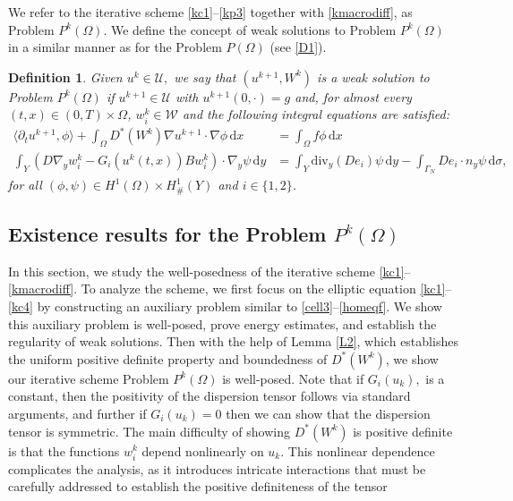 \documentclass[11pt]{article}
\newtheorem{definition}{Definition}[section]
\newcommand{\timeint}{(0,T)}
\newcommand{\di}[1]{\,\mathrm{d}#1}
\begin{document}
We refer to the iterative scheme \eqref{kc1}--\eqref{kp3} together with \eqref{kmacrodiff}, as Problem $P^k(\Omega)$. 
We define the concept of weak solutions to Problem $P^k(\Omega)$ in a similar manner as for the Problem $P(\Omega)$ (see \cref{D1}).
%
\begin{definition}\label{D2}
   Given $u^k\in\mathcal{U},$  we say that $(u^{k+1},W^k)$ is a weak solution to Problem $P^k(\Omega)$ if $u^{k+1} \in \mathcal{U}$ with $u^{k+1}(0,\cdot) = g$ and, for almost every $(t,x) \in \timeint\times \Omega$, $w_i^{k} \in \mathcal{W}$ and the following integral equations are satisfied:
\begin{subequations}
\begin{align}
       \langle \partial_t u^{k+1}, \phi \rangle+\int_{\Omega} D^*(W^{k}) \nabla u^{k+1} \cdot\nabla \phi \di{x} &=  \int_{\Omega} f \phi \di{x}\label{wfs1}\\
       \int_{Y}\left(D\nabla_y w^{k}_i-G_i(u^{k}(t,x))Bw^{k}_i\right)\cdot \nabla_y \psi\di{y}&=\int_{Y} \mathrm{div}_y( D e_i)\psi \di{y}-\int_{\Gamma_N} De_i\cdot n_y\psi \di{\sigma},
\end{align}
\end{subequations}
for all  $(\phi, \psi)\in H^1(\Omega)\times H_{\#}^1(Y)$ and $i\in\{1,2\}$.
\end{definition}
%
\subsection{Existence results for the Problem $P^k(\Omega)$}
In this section, we study the well-posedness of the iterative scheme \eqref{kc1}--\eqref{kmacrodiff}.
To analyze the scheme, we first focus on the elliptic equation \eqref{kc1}--\eqref{kc4} by constructing an auxiliary problem similar to \eqref{cell3}--\eqref{homeqf}.
We show this auxiliary problem is well-posed, prove energy estimates, and establish the regularity of weak solutions.
Then with the help of Lemma \ref{L2}, which establishes the uniform positive definite property and boundedness of $D^*(W^k)$, we show our iterative scheme Problem $P^k(\Omega)$ is well-posed. {Note that if $G_i(u_k),$ is a constant, then the positivity of the dispersion tensor follows via standard arguments, and further if $G_i(u_k)=0$ then we can show that the dispersion tensor is symmetric. The main difficulty of showing $D^*(W^k)$ is positive definite is that the functions $w_i^k$ depend nonlinearly on $u_k$. This nonlinear dependence complicates the analysis, as it introduces intricate interactions that must be carefully addressed to establish the positive definiteness of the tensor }
\end{document}
